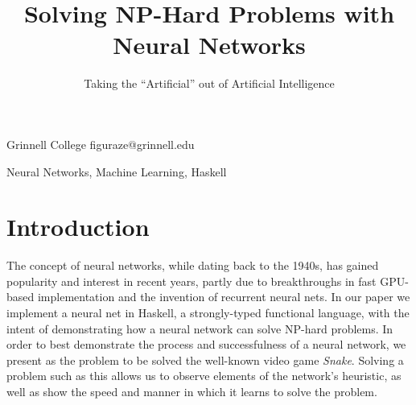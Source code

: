 \documentclass[preprint]{sigplanconf}
\begin{document}
\setlength{\pdfpageheight}{\paperheight}
\setlength{\pdfpagewidth}{\paperwidth}




\title{Solving NP-Hard Problems with Neural Networks}
\subtitle{Taking the ``Artificial'' out of Artificial Intelligence}

           {Grinnell College}
           {figuraze@grinnell.edu}

\maketitle

\begin{abstract}


\end{abstract}


\keywords
Neural Networks, Machine Learning, Haskell

\section{Introduction}

The concept of neural networks, while dating back to the 1940s, has gained popularity and interest in recent years, partly due to breakthroughs in fast GPU-based implementation and the invention of recurrent neural nets. In our paper we implement a neural net in Haskell, a strongly-typed functional language, with the intent of demonstrating how a neural network can solve NP-hard problems. In order to best demonstrate the process and successfulness of a neural network, we present as the problem to be solved the well-known video game \textit{Snake}. Solving a problem such as this allows us to observe elements of the network's heuristic, as well as show the speed and manner in which it learns to solve the problem.
\end{document}

